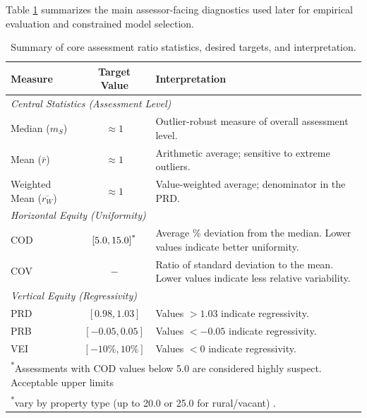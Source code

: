\documentclass[12pt, draft]{article}
\theoremstyle{plain}
\theoremstyle{definition}
\newcommand{\1}{\mathbf{1}}
\begin{document}
{Table \ref{tab:assessment_metrics_summary} summarizes the main assessor-facing diagnostics used later for empirical evaluation and constrained model selection.

\begin{table}[!ht]
\centering
\caption{Summary of core assessment ratio statistics, desired targets, and interpretation.}
\label{tab:assessment_metrics_summary}
\begin{tabular}{lcp{8.5cm}}
\toprule
\textbf{Measure} & \textbf{Target Value} & \textbf{Interpretation} \\
\midrule
\multicolumn{3}{l}{\textit{Central Statistics (Assessment Level)}} \vspace{3mm} \\
Median ($m_S$) & \(\approx 1\) & Outlier-robust measure of overall assessment level. \\
Mean ($\bar r$) & \(\approx 1\) & Arithmetic average; sensitive to extreme outliers. \\
Weighted Mean ($\overline{r_W}$) & \(\approx 1\) & Value-weighted average; denominator in the PRD. \\
\midrule
\multicolumn{3}{l}{\textit{Horizontal Equity (Uniformity)}} \vspace{3mm} \\
COD & \([5.0,15.0]\textsuperscript{*}\) & Average \% deviation from the median. Lower values indicate better uniformity. \\
COV & $-$ & Ratio of standard deviation to the mean. Lower values indicate less relative variability. \\
\midrule
\multicolumn{3}{l}{\textit{Vertical Equity (Regressivity)}} \vspace{3mm} \\
PRD & \([0.98,1.03]\) & Values \(>1.03\) indicate regressivity. \\
PRB & \([-0.05,0.05]\) & Values \(<-0.05\) indicate regressivity. \\
VEI & \([-10\%,10\%]\) & Values \(<0\) indicate regressivity. \\
\bottomrule
\multicolumn{3}{l}{\footnotesize \textsuperscript{*}Assessments with COD values below 5.0 are considered highly suspect. Acceptable upper limits} \\
\multicolumn{3}{l}{\footnotesize \textsuperscript{*}vary by property type (up to 20.0 or 25.0 for rural/vacant) \cite{IAAO2025ExposureRatio}.}
\end{tabular}
\end{table}

}
\end{document}
